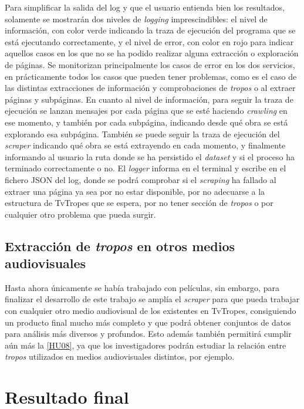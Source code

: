 Para simplificar la salida del log y que el usuario entienda bien los
resultados, solamente se mostrarán dos niveles de \textit{logging}
imprescindibles: el nivel de información, con color verde indicando la traza de
ejecución del programa que se está ejecutando correctamente, y el nivel de
error, con color en rojo para indicar aquellos casos en los que no se ha podido
realizar alguna extracción o exploración de páginas. Se monitorizan
principalmente los casos de error en los dos servicios, en prácticamente todos
los casos que pueden tener problemas, como es el caso de las distintas
extracciones de información y comprobaciones de \textit{tropos} o al extraer
páginas y subpáginas. En cuanto al nivel de información, para seguir la traza de
ejecución se lanzan mensajes por cada página que se esté haciendo
\textit{crawling} en ese momento, y también por cada subpágina, indicando desde
qué obra se está explorando esa subpágina. También se puede seguir la traza de
ejecución del \textit{scraper} indicando qué obra se está extrayendo en cada
momento, y finalmente informando al usuario la ruta donde se ha persistido el
\textit{dataset} y si el proceso ha terminado correctamente o no. El
\textit{logger} informa en el terminal y escribe en el fichero JSON del log,
donde se podrá comprobar si el \textit{scraping} ha fallado al extraer una
página ya sea por no estar disponible, por no adecuarse a la estructura de
TvTropes que se espera, por no tener sección de \textit{tropos} o por cualquier
otro problema que pueda surgir.

\subsection{Extracción de \textit{tropos} en otros medios audiovisuales} 

Hasta ahora únicamente se había trabajado con películas, sin embargo, para
finalizar el desarrollo de este trabajo se amplía el \textit{scraper} para que
pueda trabajar con cualquier otro medio audiovisual de los existentes en
TvTropes, consiguiendo un producto final mucho más completo y que podrá obtener
conjuntos de datos para análisis más diversos y profundos. Esto además también
permitirá cumplir aún más la
\href{https://github.com/jlgallego99/TropesToGo/issues/57}{[HU08]}, ya que los
investigadores podrán estudiar la relación entre \textit{tropos} utilizados en
medios audiovisuales distintos, por ejemplo.

\section{Resultado final}